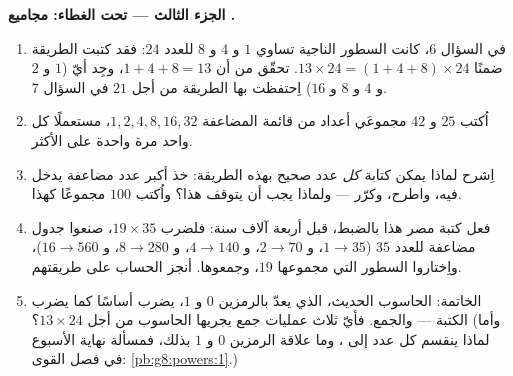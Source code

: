\begin{problem}
\medskip
\noindent\textbf{الجزء الثالث --- تحت الغطاء: مجاميع
.}
\begin{enumerate}[resume]
  \item في السؤال 6، كانت السطور الناجية تساوي $1$ و $4$
        و $8$  للعدد $24$: فقد كتبت الطريقة ضمنًا
        $13 \times 24 = (1 + 4 + 8) \times 24$. تحقّق من أن
        $1 + 4 + 8 = 13$، وجِد أيّ  ($1$ و $2$
        و $4$ و $8$ و $16$) اِحتفظت بها الطريقة من أجل $21$ في السؤال 7.
  \item اُكتب $25$ و $42$ مجموعَي أعداد من قائمة المضاعفة
        $1, 2, 4, 8, 16, 32$، مستعملًا كل واحد مرة واحدة على الأكثر.
  \item اِشرح لماذا يمكن كتابة \emph{كل} عدد صحيح
        بهذه الطريقة: خذ أكبر عدد مضاعفة يدخل فيه،
        واطرح، وكرّر --- ولماذا يجب أن يتوقف هذا؟ واُكتب $100$
        مجموعًا كهذا.
  \item فعل كتبة مصر هذا بالضبط، قبل أربعة آلاف
        سنة: فلضرب $19 \times 35$، صنعوا
        جدول مضاعفة للعدد $35$ ($1 \to 35$، و $2 \to 70$،
        و $4 \to 140$، و $8 \to 280$، و $16 \to 560$)، واِختاروا السطور
        التي مجموعها $19$، وجمعوها. أنجز الحساب على
        طريقتهم.
  \item الخاتمة: الحاسوب الحديث، الذي يعدّ بالرمزين $0$ و
        $1$، يضرب أساسًا كما يضرب الكتبة --- 
        والجمع. فأيّ ثلاث عمليات جمع يجريها
        الحاسوب من أجل $13 \times 24$؟ (وأما لماذا ينقسم كل عدد
        إلى ، وما علاقة الرمزين $0$ و $1$
        بذلك، فمسألة نهاية الأسبوع في فصل القوى:
        \cref{pb:g8:powers:1}.)
\end{enumerate}
\end{problem}
